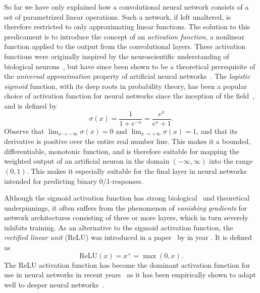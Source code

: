 So far we have only explained how a convolutional neural network consists of a set of parametrized linear operations.
Such a network, if left unaltered, is therefore restricted to only approximating linear functions.
The solution to this predicament is to introduce the concept of an \textit{activation function}, a nonlinear function applied to the output from the convolutional layers.
These activation functions were originally inspired by the neuroscientific understanding of biological neurons~\cite[p.~165]{goodfellow}, but have since been shown to be a theoretical prerequisite of the \textit{universal approximation} property of artificial neural networks~\cite{uat-sigmoid,uat-nonpolynomial}.
The \textit{logistic sigmoid} function, with its deep roots in probability theory, has been a popular choice of activation function for neural networks since the inception of the field~\cite{rosenblatt-perceptron-1958}, and is defined by
%
\begin{equation*}
  \sigma(x) = \frac{1}{1 + e^{-x}} = \frac{e^x}{e^x + 1}.
  \tag{Sigmoid activation function}
\end{equation*}
%
Observe that $\lim_{x \to -\infty} \sigma(x) = 0$ and $\lim_{x \to +\infty} \sigma(x) = 1$, and that its derivative is positive over the entire real number line. This makes it a bounded, differentiable, monotonic function, and is therefore suitable for mapping the weighted output of an artificial neuron in the domain $(-\infty, \infty)$ into the range $(0, 1)$.
This makes it especially suitable for the final layer in neural networks intended for predicting binary 0/1-responses.

Although the sigmoid activation function has strong biological~\cite{rosenblatt-perceptron-1958} and theoretical~\cite{uat-sigmoid} underpinnings, it often suffers from the phenomenon of \textit{vanishing gradients} for network architectures consisting of three or more layers, which in turn severely inhibits training.
As an alternative to the sigmoid activation function, the \textit{rectified linear unit} (ReLU) was introduced in a paper~\cite{relu-original-paper} by \citeauthor{relu-original-paper} in year \citeyear{relu-original-paper}.
It is defined as
%
\begin{equation*}
  \mathrm{ReLU}(x) = x^+ = \max(0, x).
  \tag{ReLU activation function}
\end{equation*}
%
The ReLU activation function has become the dominant activation function for use in neural networks in recent years~\cite[p.~438]{relu-popularity} as it has been empirically shown to adapt well to deeper neural networks~\cite{relu-better-than-sigmoid}.
